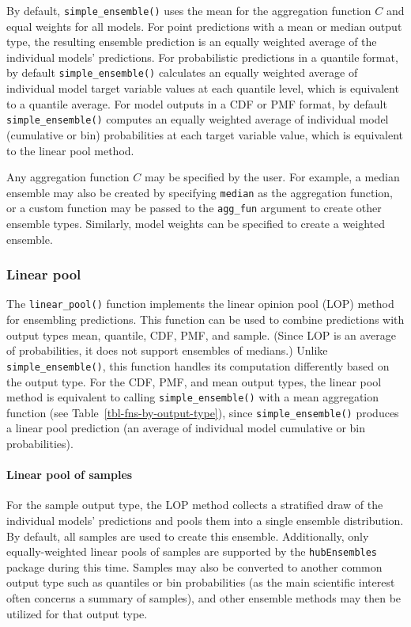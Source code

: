\documentclass[
]{article}
\let\oldparagraph\paragraph
\renewcommand{\paragraph}[1]{\oldparagraph{#1}\mbox{}}
\begin{document}
By default, \texttt{simple\_ensemble()} uses the mean for the
aggregation function \(C\) and equal weights for all models. For point
predictions with a mean or median output type, the resulting ensemble
prediction is an equally weighted average of the individual models'
predictions. For probabilistic predictions in a quantile format, by
default \texttt{simple\_ensemble()} calculates an equally weighted
average of individual model target variable values at each quantile
level, which is equivalent to a quantile average. For model outputs in a
CDF or PMF format, by default \texttt{simple\_ensemble()} computes an
equally weighted average of individual model (cumulative or bin)
probabilities at each target variable value, which is equivalent to the
linear pool method.

Any aggregation function \(C\) may be specified by the user. For
example, a median ensemble may also be created by specifying
\texttt{median} as the aggregation function, or a custom function may be
passed to the \texttt{agg\_fun} argument to create other ensemble types.
Similarly, model weights can be specified to create a weighted ensemble.

\subsubsection{Linear pool}\label{sec-linear-pool}

The \texttt{linear\_pool()} function implements the linear opinion pool
(LOP) method for ensembling predictions. This function can be used to
combine predictions with output types mean, quantile, CDF, PMF, and
sample. (Since LOP is an average of probabilities, it does not support
ensembles of medians.) Unlike \texttt{simple\_ensemble()}, this function
handles its computation differently based on the output type. For the
CDF, PMF, and mean output types, the linear pool method is equivalent to
calling \texttt{simple\_ensemble()} with a mean aggregation function
(see Table~\ref{tbl-fns-by-output-type}), since
\texttt{simple\_ensemble()} produces a linear pool prediction (an
average of individual model cumulative or bin probabilities).

\paragraph{Linear pool of samples}\label{linear-pool-of-samples}

For the sample output type, the LOP method collects a stratified draw of
the individual models' predictions and pools them into a single ensemble
distribution. By default, all samples are used to create this ensemble.
Additionally, only equally-weighted linear pools of samples are
supported by the \texttt{hubEnsembles} package during this time. Samples
may also be converted to another common output type such as quantiles or
bin probabilities (as the main scientific interest often concerns a
summary of samples), and other ensemble methods may then be utilized for
that output type.
\end{document}
